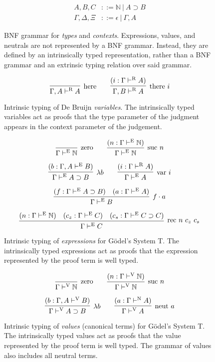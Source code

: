 \documentclass[preprint,nonatbib]{sigplanconf}
\numberwithin{mysubdfn}{mydfn}
\def\arr{\supset}
\def\app{\cdot}
\def\lam{\lambda}
\def\nat{\mathbb{N}}
\newcommand{\turn}[1]{\vdash^\con{#1}}
\newcommand{\con}[1]{\textmd{#1}}
\newcommand{\fun}[1]{\textmd{#1}}
\newcommand{\type}[1]{\Gamma \turn{E} #1}
\newcommand{\ctype}[2]{\Gamma , #1 \turn{E} #2}
\newcommand{\typv}[1]{\Gamma \turn{V} #1}
\newcommand{\ctypv}[2]{\Gamma , #1 \turn{V} #2}
\newcommand{\typn}[1]{\Gamma \turn{N} #1}
\newcommand{\typr}[1]{\Gamma \turn{R} #1}
\newcommand{\ctypr}[2]{\Gamma , #1 \turn{R} #2}
\begin{document}


\begin{figure}
\caption{
BNF grammar for {\it types} and {\it contexts}. 
Expressions, values, and neutrals
are not represented by a BNF grammar. Instead, they are defined by
an intrinsically typed representation, rather than a BNF grammar and
an extrinsic typing relation over said grammar.
}
\begin{align*}
A, B, C &::= \nat ~ | ~ A \arr B \\
\Gamma, \Delta, \Xi &::= \epsilon ~ | ~ \Gamma , A
\end{align*}
\label{fig:gram}
\end{figure}

\begin{figure}
\caption{
Intrinsic typing of De Bruijn {\it variables}.
The intrinsically typed variables act as proofs that the type
parameter of the judgment appears in the context parameter of the
judgement.
}
$$
\infer
  [\con{here}]
  {\ctypr{A}{A}}
{
}
\qquad
\infer
  [\con{there} ~ i]
  {\ctypr{B}{A}}
{
  (i : \typr{A})
}
$$
\label{fig:typr}
\end{figure}

\begin{figure}
\caption{
Intrinsic typing of {\it expressions} for G{\"o}del's System T. The
intrinsically typed expressions act as proofs that the expression
represented by the proof term is well typed.
}
$$
\infer
  [\con{zero}]
  {\type{\nat}}
{}
\qquad
\infer
  [\con{suc} ~ n]
  {\type{\nat}}
{
  (n : \type{\nat})
}
$$

$$
\infer
  [\lam b]
  {\type{A \arr B}}
{
  (b : \ctype{A}{B})
}
\qquad
\infer
  [\fun{var} ~ i]
  {\type{A}}
{
  (i : \typr{A})
}
$$

$$
\infer
  [f \app a]
  {\type{B}}
{
  (f : \type{A \arr B})
  &
  (a : \type{A})
}
$$

$$
\infer
  [\fun{rec} ~ n ~ c_z ~ c_s]
  {\type{C}}
{
  (n : \type{\nat})
  &
  (c_z : \type{C})
  &
  (c_s : \type{C \arr C})
}
$$
\label{fig:type}
\end{figure}

\begin{figure}
\caption{
Intrinsic typing of {\it values} (canonical terms) for G{\"o}del's System T.
The intrinsically typed values act as proofs that the value
represented by the proof term is well typed. The grammar of values
also includes all neutral terms.
}
$$
\infer
  [\con{zero}]
  {\typv{\nat}}
{}
\qquad
\infer
  [\con{suc} ~ n]
  {\typv{\nat}}
{
  (n : \typv{\nat})
}
$$

$$
\infer
  [\lam b]
  {\typv{A \arr B}}
{
  (b : \ctypv{A}{B})
}
\qquad
\infer
  [\fun{neut} ~ a]
  {\typv{A}}
{
  (a : \typn{A})
}
$$
\label{fig:typv}
\end{figure}
\end{document}
